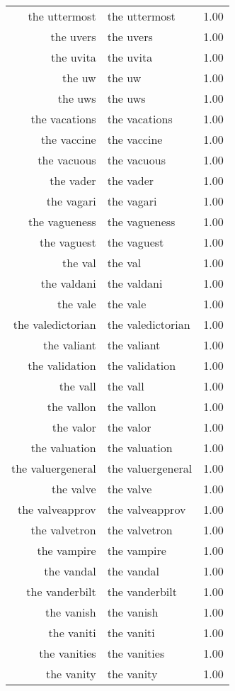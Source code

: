 \begin{table}[ht]
\begin{tabular}{rlr}
  the uttermost & the uttermost & 1.00 \\ 
  the uvers & the uvers & 1.00 \\ 
  the uvita & the uvita & 1.00 \\ 
  the uw & the uw & 1.00 \\ 
  the uws & the uws & 1.00 \\ 
  the vacations & the vacations & 1.00 \\ 
  the vaccine & the vaccine & 1.00 \\ 
  the vacuous & the vacuous & 1.00 \\ 
  the vader & the vader & 1.00 \\ 
  the vagari & the vagari & 1.00 \\ 
  the vagueness & the vagueness & 1.00 \\ 
  the vaguest & the vaguest & 1.00 \\ 
  the val & the val & 1.00 \\ 
  the valdani & the valdani & 1.00 \\ 
  the vale & the vale & 1.00 \\ 
  the valedictorian & the valedictorian & 1.00 \\ 
  the valiant & the valiant & 1.00 \\ 
  the validation & the validation & 1.00 \\ 
  the vall & the vall & 1.00 \\ 
  the vallon & the vallon & 1.00 \\ 
  the valor & the valor & 1.00 \\ 
  the valuation & the valuation & 1.00 \\ 
  the valuergeneral & the valuergeneral & 1.00 \\ 
  the valve & the valve & 1.00 \\ 
  the valveapprov & the valveapprov & 1.00 \\ 
  the valvetron & the valvetron & 1.00 \\ 
  the vampire & the vampire & 1.00 \\ 
  the vandal & the vandal & 1.00 \\ 
  the vanderbilt & the vanderbilt & 1.00 \\ 
  the vanish & the vanish & 1.00 \\ 
  the vaniti & the vaniti & 1.00 \\ 
  the vanities & the vanities & 1.00 \\ 
  the vanity & the vanity & 1.00 \\ 

\end{tabular}
\end{table}
